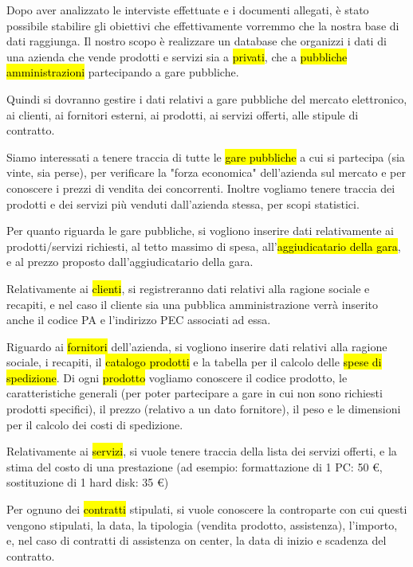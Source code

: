 
Dopo aver analizzato le interviste effettuate e i documenti allegati, è stato possibile stabilire gli obiettivi che effettivamente vorremmo che la nostra base di dati raggiunga.
Il nostro scopo è realizzare un database che organizzi i dati di una azienda che vende prodotti e servizi sia a \hl{privati}, che a \hl{pubbliche amministrazioni} partecipando a gare pubbliche.


\noindent
\newline
Quindi si dovranno gestire i dati relativi a gare pubbliche del mercato elettronico, ai clienti, ai fornitori esterni, ai prodotti, ai servizi offerti, alle stipule di contratto.

\noindent
\newline
Siamo interessati a tenere traccia di tutte le \hl{gare pubbliche} a cui si partecipa (sia vinte, sia perse), per verificare la "forza economica" dell'azienda sul mercato e per conoscere i prezzi di vendita dei concorrenti.
Inoltre vogliamo tenere traccia dei prodotti e dei servizi più venduti dall'azienda stessa, per scopi statistici.

\noindent
\newline
Per quanto riguarda le gare pubbliche, si vogliono inserire dati relativamente ai prodotti/servizi richiesti, al tetto massimo di spesa, all'\hl{aggiudicatario della gara}, e al prezzo proposto dall'aggiudicatario della gara.

\noindent
\newline
Relativamente ai \hl{clienti}, si registreranno dati relativi alla ragione sociale e recapiti, e nel caso il cliente sia una pubblica amministrazione verrà inserito anche il codice PA e l'indirizzo PEC associati ad essa.

\noindent
\newline
Riguardo ai \hl{fornitori} dell'azienda, si vogliono inserire dati relativi alla ragione sociale, i recapiti, il \hl{catalogo prodotti} e la tabella per il calcolo delle \hl{spese di spedizione}.
Di ogni \hl{prodotto} vogliamo conoscere il codice prodotto, le caratteristiche generali (per poter partecipare a gare in cui non sono richiesti prodotti specifici), il prezzo (relativo a un dato fornitore), il peso e le dimensioni per il calcolo dei costi di spedizione.

\noindent
\newline
Relativamente ai \hl{servizi}, si vuole tenere traccia della lista dei servizi offerti, e la stima del costo di una prestazione (ad esempio: formattazione di 1 PC: 50 \euro, sostituzione di 1 hard disk: 35 \euro)

\noindent
\newline
Per ognuno dei \hl{contratti} stipulati, si vuole conoscere la controparte con cui questi vengono stipulati, la data, la tipologia (vendita prodotto, assistenza), l'importo, e, nel caso di contratti di assistenza on center, la data di inizio e scadenza del contratto.

\newpage
